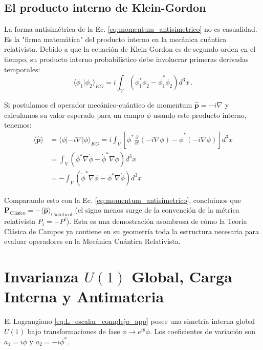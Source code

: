 \subsection{El producto interno de Klein-Gordon}

La forma antisimétrica de la Ec. \eqref{eq:momentum_antisimetrico} no es casualidad. Es la "firma matemática" del producto interno en la mecánica cuántica relativista. Debido a que la ecuación de Klein-Gordon es de segundo orden en el tiempo, su producto interno probabilístico debe involucrar primeras derivadas temporales:
\begin{equation}
    \langle \phi_1 | \phi_2 \rangle_{KG} = i \int_V \left( \phi_1^* \dot{\phi}_2 - \dot{\phi}_1^* \phi_2 \right) d^3x \, .
\end{equation}

Si postulamos el operador mecánico-cuántico de momentum $\mathbf{\hat{p}} = -i\nabla$ y calculamos su valor esperado para un campo $\phi$ usando este producto interno, tenemos:
\begin{align}
    \langle \mathbf{\hat{p}} \rangle &= \langle \phi | -i\nabla | \phi \rangle_{KG} = i \int_V \left[ \phi^* \frac{\partial}{\partial t}(-i\nabla\phi) - \dot{\phi}^* (-i\nabla\phi) \right] d^3x \nonumber \\
    &= \int_V \left( \phi^* \nabla \dot{\phi} - \dot{\phi}^* \nabla \phi \right) d^3x \nonumber \\
    &= - \int_V \left( \dot{\phi}^* \nabla \phi - \phi^* \nabla \dot{\phi} \right) d^3x \, .
\end{align}

Comparando esto con la Ec. \eqref{eq:momentum_antisimetrico}, concluimos que $\mathbf{P}_{\text{Clásico}} = - \langle \mathbf{\hat{p}} \rangle_{\text{Cuánticol}}$ (el signo menos surge de la convención de la métrica relativista $P_i = -P^i$). Esta es una demostración asombrosa de cómo la Teoría Clásica de Campos ya contiene en su geometría toda la estructura necesaria para evaluar operadores en la Mecánica Cuántica Relativista.

\section{Invarianza $U(1)$ Global, Carga Interna y Antimateria}

El Lagrangiano \eqref{eq:L_escalar_complejo_app} posee una simetría interna global $U(1)$ bajo transformaciones de fase $\phi \to e^{i\theta}\phi$. Los coeficientes de variación son $a_1 = i\phi$ y $a_2 = -i\phi^*$.

